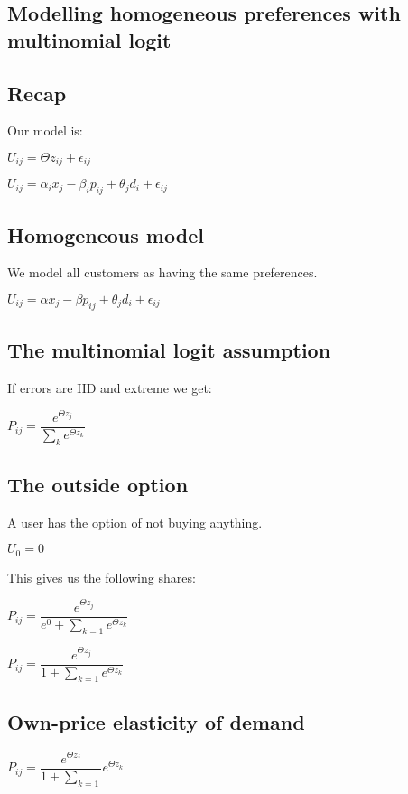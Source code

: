 
\subsection{Modelling homogeneous preferences with multinomial logit}

\subsection{Recap}

Our model is:

\(U_{ij}=\Theta z_{ij} + \epsilon_{ij}\)

\(U_{ij}=\alpha_i x_j -\beta_i p_{ij} + \theta_j d_i +\epsilon_{ij}\)

\subsection{Homogeneous model}

We model all customers as having the same preferences.

\(U_{ij}=\alpha x_j -\beta p_{ij} + \theta_j d_i +\epsilon_{ij}\)

\subsection{The multinomial logit assumption}

If errors are IID and extreme we get:

\(P_{ij}=\dfrac{e^{\Theta z_j}}{\sum_k e^{\Theta z_k }}\)

\subsection{The outside option}

A user has the option of not buying anything.

\(U_0=0\)

This gives us the following shares:

\(P_{ij}=\dfrac{e^{\Theta z_j}}{e^0+\sum_{k=1} e^{\Theta z_k }}\)

\(P_{ij}=\dfrac{e^{\Theta z_j}}{1+\sum_{k=1} e^{\Theta z_k }}\)

\subsection{Own-price elasticity of demand}

\(P_{ij}=\dfrac{e^{\Theta z_j}}{1+\sum_{k=1}} e^{\Theta z_k }\)

